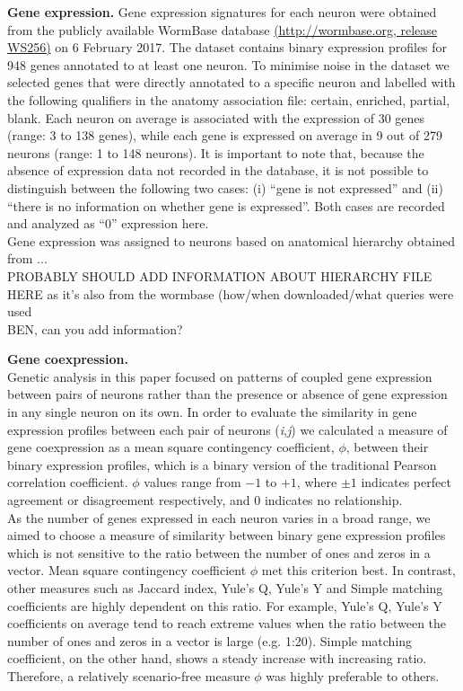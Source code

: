 \documentclass[10pt,letterpaper]{article}
\begin{document}
\textbf{Gene expression.}
Gene expression signatures for each neuron were obtained from the publicly available WormBase database \href{ftp://ftp.wormbase.org/pub/wormbase/releases/WS256/ONTOLOGY/anatomy_association.WS256.wb}{(http://wormbase.org, release WS256)} on 6 February 2017. 
The dataset contains binary expression profiles for 948 genes annotated to at least one neuron. 
To minimise noise in the dataset we selected genes that were directly annotated to a specific neuron and labelled with the following qualifiers in the anatomy association file: certain, enriched, partial, blank. 
Each neuron on average is associated with the expression of 30 genes (range: 3 to 138 genes), while each gene is expressed on average in 9 out of 279 neurons (range: 1 to 148 neurons).     
It is important to note that, because the absence of expression data not recorded in the database, it is not possible to distinguish between the following two cases: (i) ``gene is not expressed'' and (ii) ``there is no information on whether gene is expressed''.
Both cases are recorded and analyzed as ``0'' expression here.\\
Gene expression was assigned to neurons based on anatomical hierarchy obtained from ...\\
PROBABLY SHOULD ADD INFORMATION ABOUT HIERARCHY FILE HERE as it's also from the wormbase (how/when downloaded/what queries were used \\
BEN, can you add information?

\textbf{Gene coexpression.}\\
Genetic analysis in this paper focused on patterns of coupled gene expression between pairs of neurons rather than the presence or absence of gene expression in any single neuron on its own. 
In order to evaluate the similarity in gene expression profiles between each pair of neurons (\textit{i},\textit{j}) we calculated a measure of gene coexpression as a mean square contingency coefficient, $\phi$, between their binary expression profiles, which is a binary version of the traditional Pearson correlation coefficient.  
$\phi$ values range from $-1$ to $+1$, where $\pm1$ indicates perfect agreement or disagreement respectively, and 0 indicates no relationship. \\
As the number of genes expressed in each neuron varies in a broad range, we aimed to choose a measure of similarity between binary gene expression profiles which is not sensitive to the ratio between the number of ones and zeros in a vector. 
Mean square contingency coefficient $\phi$ met this criterion best. 
In contrast, other measures such as Jaccard index, Yule's Q, Yule's Y and Simple matching coefficients are highly dependent on this ratio. 
For example, Yule's Q, Yule's Y coefficients on average tend to reach extreme values when the ratio between the number of ones and zeros in a vector is large (e.g. 1:20). 
Simple matching coefficient, on the other hand, shows a steady increase with increasing ratio.     
Therefore, a relatively scenario-free measure $\phi$ was highly preferable to others.     \\
\end{document}
